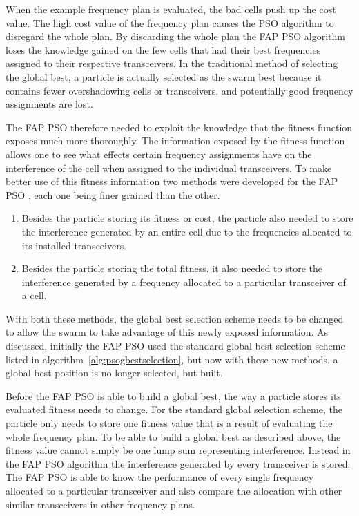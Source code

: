 When the example frequency plan is evaluated, the bad cells push up the cost value. The high cost value of the frequency plan causes the \gls{PSO} algorithm to disregard the whole plan. By discarding the whole plan the \gls{FAP} \gls{PSO} algorithm loses the knowledge gained on the few cells that had their best frequencies assigned to their respective transceivers. In the traditional method of selecting the global best, a particle is actually selected as the swarm best because it contains fewer overshadowing cells or transceivers, and potentially good frequency assignments are lost.

The \gls{FAP} \gls{PSO} therefore needed to exploit the knowledge that the fitness function exposes much more thoroughly. The information exposed by the fitness function allows one to see what effects certain frequency assignments have on the interference of the cell when assigned to the individual transceivers. To make better use of this fitness information two methods were developed for the \gls{FAP} \gls{PSO} , each one being finer grained than the other.

\begin{enumerate}
\item Besides the particle storing its fitness or cost, the particle also needed to store the interference generated by an entire cell due to the frequencies allocated to its installed transceivers.
\item Besides the particle storing the total fitness, it also needed to store the interference generated by a frequency allocated to a particular transceiver of a cell.
\end{enumerate}

With both these methods, the global best selection scheme needs to be changed to allow the swarm to take advantage of this newly exposed information. As discussed, initially the \gls{FAP} \gls{PSO} used the standard global best selection scheme listed in algorithm~\ref{alg:psogbestselection}, but now with these new methods, a global best position is no longer selected, but built.

Before the \gls{FAP} \gls{PSO} is able to build a global best, the way a particle stores its evaluated fitness needs to change. For the standard global selection scheme, the particle only needs to store one fitness value that is a result of evaluating the whole frequency plan. To be able to build a global best as described above, the fitness value cannot simply be one lump sum representing interference. Instead in the \gls{FAP} \gls{PSO} algorithm the interference generated by every transceiver is stored. The \gls{FAP} \gls{PSO} is able to know the performance of every single frequency allocated to a particular transceiver and also compare the allocation with other similar transceivers in other frequency plans.

